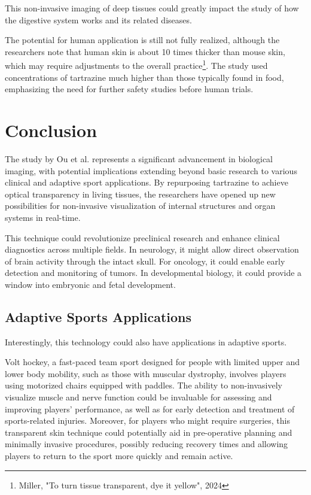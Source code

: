 \documentclass[12pt]{article}
\begin{document}
This non-invasive imaging of deep tissues could greatly impact the study of how the digestive system works and its related diseases.

The potential for human application is still not fully realized, although the researchers note that human skin is about 10 times thicker than mouse skin, which may require adjustments to the overall practice\footnote{Miller, "To turn tissue transparent, dye it yellow", 2024}. The study used concentrations of tartrazine much higher than those typically found in food, emphasizing the need for further safety studies before human trials.


\section{Conclusion}
\label{sec:conclusion}
The study by Ou et al. represents a significant advancement in biological imaging, with potential implications extending beyond basic research to various clinical and adaptive sport applications. By repurposing tartrazine to achieve optical transparency in living tissues, the researchers have opened up new possibilities for non-invasive visualization of internal structures and organ systems in real-time.

This technique could revolutionize preclinical research and enhance clinical diagnostics across multiple fields. In neurology, it might allow direct observation of brain activity through the intact skull. For oncology, it could enable early detection and monitoring of tumors. In developmental biology, it could provide a window into embryonic and fetal development.

\subsection{Adaptive Sports Applications}
Interestingly, this technology could also have applications in adaptive sports. 

Volt hockey, a fast-paced team sport designed for people with limited upper and lower body mobility, such as those with muscular dystrophy, involves players using motorized chairs equipped with paddles. The ability to non-invasively visualize muscle and nerve function could be invaluable for assessing and improving players' performance, as well as for early detection and treatment of sports-related injuries. Moreover, for players who might require surgeries, this transparent skin technique could potentially aid in pre-operative planning and minimally invasive procedures, 
possibly reducing recovery times and allowing players to return to the sport more quickly and remain active. 
\end{document}
